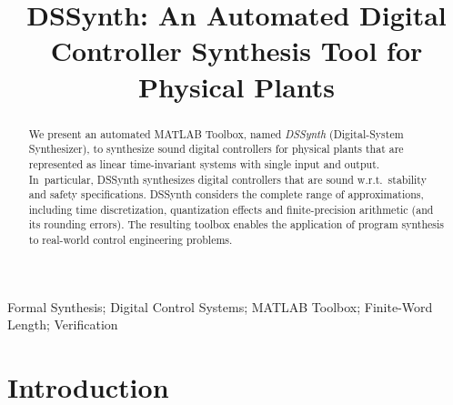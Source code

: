 \documentclass[10pt,conference]{IEEEtran}
\begin{document}
\title{DSSynth: An Automated Digital Controller Synthesis Tool for Physical Plants} 

\author{
}

			
\maketitle

\begin{abstract}
%
We present an automated MATLAB Toolbox, named \emph{DSSynth} (Digital-System
Synthesizer), to synthesize sound digital controllers for physical plants
that are represented as linear time-invariant systems with single input and
output.  In~particular, DSSynth synthesizes digital controllers that are
sound w.r.t.~stability and safety specifications.  DSSynth considers the
complete range of approximations, including time discretization,
quantization effects and finite-precision arithmetic (and its rounding
errors).  The resulting toolbox enables the application of program synthesis
to real-world control engineering problems.
%
\end{abstract}

%
%
\begin{IEEEkeywords}
Formal Synthesis; Digital Control Systems; MATLAB Toolbox; Finite-Word Length; Verification
\end{IEEEkeywords}

\section{Introduction}
\end{document}
